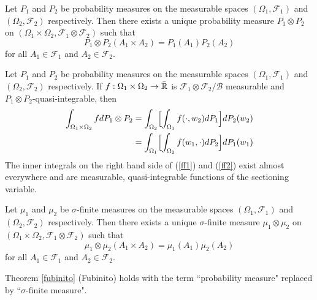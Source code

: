 \begin{theorem}
Let $P_1$ and $P_2$ be probability measures on the measurable spaces $(\Omega_1,\mathcal F_1)$ and $(\Omega_2,\mathcal F_2)$ respectively. Then there exists a unique probability measure $P_1\otimes P_2$ on $(\Omega_1\times \Omega_2,\mathcal F_1\otimes \mathcal F_2 )$ such that
\[ P_1\otimes P_2(A_1\times A_2)= P_1(A_1)P_2(A_2) \]
 for all $A_1\in\mathcal F_1$ and $A_2\in \mathcal F_2$.
\end{theorem}

\begin{theorem}[{\bf Fubinito}] \label{fubinito}
Let $P_1$ and $P_2$ be probability measures on the measurable spaces $(\Omega_1,\mathcal F_1)$ and $(\Omega_2,\mathcal F_2)$ respectively. If $f:\Omega_1\times\Omega_2\rightarrow \bar{\Bbb R}$ is $\mathcal F_1\otimes \mathcal F_2/\mathcal B$ measurable and $P_1\otimes P_2$-quasi-integrable, then
 \begin{align}
 \label{ff1}
   \int_{\Omega_1\times\Omega_2} f dP_1\otimes P_2 &=\int_{\Omega_2}\Bigl[ \int_{\Omega_1} f(\cdot,w_2) dP_1 \Bigr] dP_2(w_2)\\
   &=   \int_{\Omega_1}\Bigl[ \int_{\Omega_2} f(w_1,\cdot) dP_2 \Bigr] dP_1(w_1) \label{ff2}
  \end{align}
The inner integrals on the right hand side of (\ref{ff1}) and (\ref{ff2}) exist almost everywhere and are measurable, quasi-integrable functions of the sectioning variable.
\end{theorem}


\begin{theorem}
Let $\mu_1$ and $\mu_2$ be $\sigma$-finite measures on the measurable spaces $(\Omega_1,\mathcal F_1)$ and $(\Omega_2,\mathcal F_2)$ respectively. Then there exists a unique $\sigma$-finite measure $\mu_1\otimes \mu_2$ on $(\Omega_1\times \Omega_2,\mathcal F_1\otimes \mathcal F_2 )$ such that
\[ \mu_1\otimes \mu_2(A_1\times A_2)= \mu_1(A_1)\mu_2(A_2) \]
 for all $A_1\in\mathcal F_1$ and $A_2\in \mathcal F_2$.
\end{theorem}

\begin{theorem}[{\bf Fubini}]
Theorem \ref{fubinito} (Fubinito) holds with the term ``probability measure" replaced by ``$\sigma$-finite measure".
\end{theorem}



